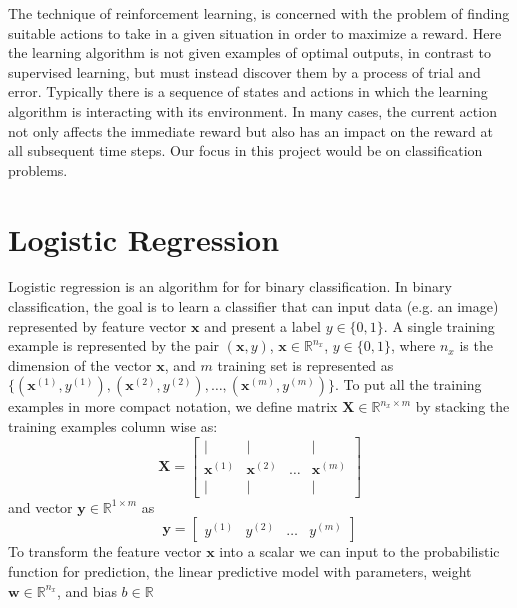 \documentclass[12pt]{report}
\numberwithin{equation}{section}
\begin{document}
The technique of {reinforcement learning}, {\cite{Sutton:1998:IRL:551283}} is concerned with the problem of finding suitable actions to take in a given situation in order to maximize a reward. Here the learning algorithm is not given examples of optimal outputs, in contrast to supervised learning, but must instead discover them by a process of trial and error. Typically there is a sequence of states and actions in which the learning algorithm is interacting with its environment. In many cases, the current action not only affects the immediate reward but also has an impact on the reward at all subsequent time steps. Our focus in this project would be on classification problems.

\section{Logistic Regression}
Logistic regression is an algorithm for for binary classification. In binary classification, the goal is to learn a classifier that can input data (e.g. an image) represented by feature vector $\bm{x}$ and present a label $y \in \{0,1\}$.  A single training example is represented by the pair $(\bm{x}, y)$, $\bm{x} \in \mathbb{R}^{n_x}$, $y \in \{0,1\}$, where $n_x$ is the dimension of the vector $\bm{x}$, and $m$ training set is represented as $\{(\bm{x}^{(1)},y^{(1)}), (\bm{x}^{(2)},y^{(2)}), \hdots, (\bm{x}^{(m)},y^{(m)})\}$. To put all the training examples in more compact notation, we define matrix $\bm{X}\in\mathbb{R}^{n_x\times m}$ by stacking the training examples column wise as:
\begin{equation}\label{eqn:train1}
\bm{X} = \left[\begin{array}{cccc}
		 | & | &  & | \\
		 \bm{x}^{(1)} & \bm{x}^{(2)} & \hdots & \bm{x}^{(m)} \\
		 | & | &  & |
		 \end{array}\right]
\end{equation}
and vector $\bm{y}\in \mathbb{R}^{1\times m}$ as 
\begin{equation}\label{eqn:train2}
\bm{y} = \left[\begin{array}{cccc}
		 y^{(1)} & y^{(2)} & \hdots & y^{(m)} 
		 \end{array}\right]
\end{equation}
To transform the feature vector $\bm{x}$ into a scalar we can input to the probabilistic function for prediction, the linear predictive model with parameters, weight $\bm{w}\in \mathbb{R}^{n_x}$, and bias $b\in\mathbb{R}$
\end{document}
